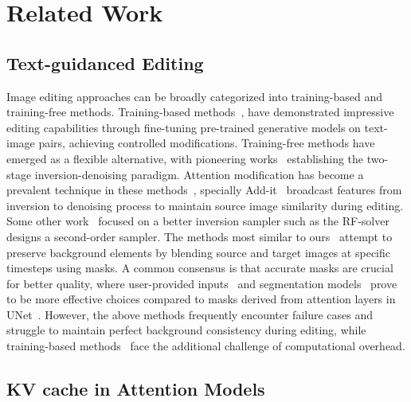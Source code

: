 
\section{Related Work}
\label{sec:related}

\subsection{Text-guidanced Editing}

Image editing approaches can be broadly categorized into training-based and training-free methods. Training-based methods~\cite{kawar2023imagic,brooks2023instructpix2pix,ju2024brushnet,li2024brushedit,flux}, have demonstrated impressive editing capabilities through fine-tuning pre-trained generative models on text-image pairs, achieving controlled modifications. Training-free methods have emerged as a flexible alternative, with pioneering works~\cite{sdedit,hertz2022prompt,tumanyan2023plug,dong2023prompt} establishing the two-stage inversion-denoising paradigm. Attention modification has become a prevalent technique in these methods~\cite{cao2023masactrl,li2023stylediffusion,xu2024headrouter,avrahami2024stable,tewel2024add}, specially Add-it~\cite{tewel2024add} broadcast features from inversion to denoising process to maintain source image similarity during editing. Some other work~\cite{mokady2023null,miyake2023negative,ju2024pnp,lin2024schedule,wang2024taming} focused on a better inversion sampler such as the RF-solver~\cite{wang2024taming} designs a second-order sampler. The methods most similar to ours~\cite{avrahami2023blended,chen2024region,liu2024lipe,tewel2024add} attempt to preserve background elements by blending source and target images at specific timesteps using masks. A common consensus is that accurate masks are crucial for better quality, where user-provided inputs~\cite{ju2024brushnet,li2024brushedit} and segmentation models~\cite{ravi2024sam,huang2024segment,yang2022lavt,yang2024language,Liu_2024_CVPR,liu2024universal,bai2024self} prove to be more effective choices compared to masks derived from attention layers in UNet~\cite{ronneberger2015u}. However, the above methods frequently encounter failure cases and struggle to maintain perfect background consistency during editing, while training-based methods~\cite{kawar2023imagic,brooks2023instructpix2pix,zhuang2024task,ju2024brushnet,li2024brushedit,flux} face the additional challenge of computational overhead.

\subsection{KV cache in Attention Models}

